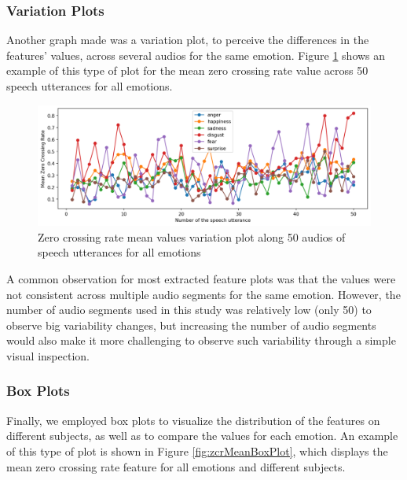 \subsubsection{Variation Plots}

Another graph made was a variation plot, to perceive the differences in the features' values, across several audios for the same emotion. Figure \ref{fig:zcrMeanVar} shows an example of this type of plot for the mean zero crossing rate value across 50 speech utterances for all emotions.

\begin{figure}[H]
	\centering
	\includegraphics[width=\linewidth]{figs/4_1_traditional/meanZCRVar.png}
	\caption{Zero crossing rate mean values variation plot along 50 audios of speech utterances for all emotions}
	\label{fig:zcrMeanVar}
\end{figure}

A common observation for most extracted feature plots was that the values were not consistent across multiple audio segments for the same emotion. However, the number of audio segments used in this study was relatively low (only 50) to observe big variability changes, but increasing the number of audio segments would also make it more challenging to observe such variability through a simple visual inspection.

\subsubsection{Box Plots}

Finally, we employed box plots to visualize the distribution of the features on different subjects, as well as to compare the values for each emotion. An example of this type of plot is shown in Figure \ref{fig:zcrMeanBoxPlot}, which displays the mean zero crossing rate feature for all emotions and different subjects. 

